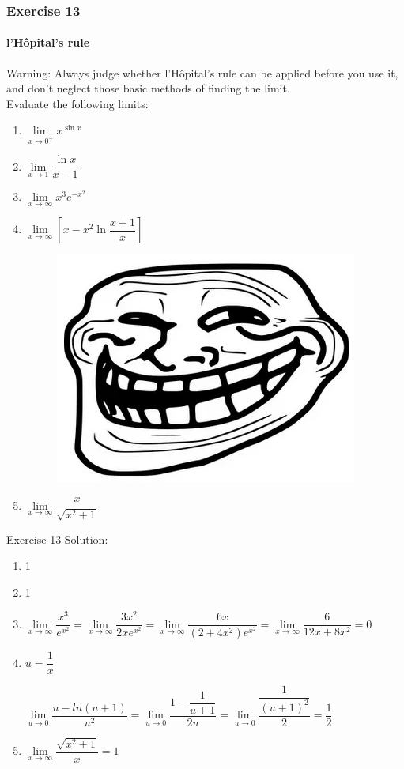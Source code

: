 \begin{frame}
    \frametitle{Exercise 13}
    \framesubtitle{l'Hôpital's rule}
    \alert{Warning}: Always judge whether l'Hôpital's rule can be applied before you use it, and \alert{don't neglect those basic methods of finding the limit}.\\
    \bigskip
    Evaluate the following limits:
    \begin{enumerate}
        \item $\lim\limits_{\textit{x} \to 0^{+}}x^{\sin{x}}$
        \item $\lim\limits_{\textit{x} \to 1}\dfrac{\ln x}{x-1}$
        \item $\lim\limits_{\textit{x} \to \infty}x^{3}e^{-x^{2}}$
        \item $\lim\limits_{\textit{x} \to \infty}[x - x^{2}\ln{\dfrac{x + 1}{x}}]$\\
              \begin{figure}
                  \includegraphics[width=0.1\linewidth]{res/troll.png}
              \end{figure}
        \item \begin{center}
                  $\lim\limits_{\textit{x} \to \infty}\dfrac{x}{\sqrt{x^{2} + 1}}$
              \end{center}
    \end{enumerate}
\end{frame}



\begin{frame}{Exercise 13}
    Solution:
    \begin{enumerate}
        \item 1
        \item 1
        \item $\lim\limits_{\textit{x} \to \infty}\dfrac{x^3}{e^{x^2}} = \lim\limits_{\textit{x} \to \infty} \dfrac{3x^2}{2xe^{x^2}} = \lim\limits_{\textit{x} \to \infty} \dfrac{6x}{(2 + 4x^2)e^{x^2}} =  \lim\limits_{\textit{x} \to \infty} \dfrac{6}{12x + 8x^2} = 0$
        \item $ u = \dfrac{1}{x}$


              $\lim\limits_{\textit{u} \to 0} \dfrac{u - ln(u+1)}{u^2} = \lim\limits_{\textit{u} \to 0} \dfrac{1 - \dfrac{1}{u+1}}{2u} = \lim\limits_{\textit{u} \to 0} \dfrac{\dfrac{1}{(u+1)^2}}{2} = \dfrac{1}{2}$
        \item $\lim\limits_{\textit{x} \to \infty} \dfrac{\sqrt{x^2 + 1}}{x} = 1$
    \end{enumerate}

\end{frame}




